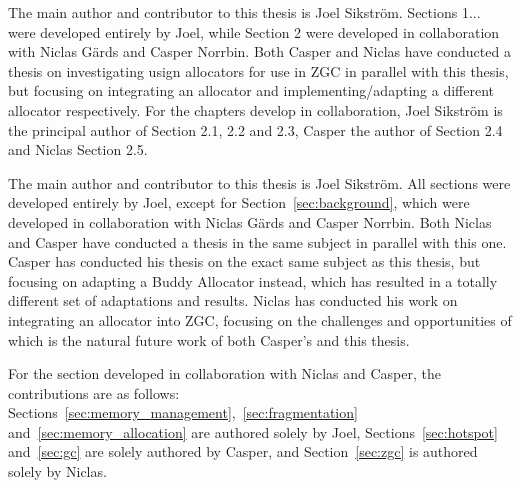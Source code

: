 
The main author and contributor to this thesis is Joel Sikström. Sections 1... were developed entirely by Joel, while Section 2 were developed in collaboration with Niclas Gärds and Casper Norrbin. Both Casper and Niclas have conducted a thesis on investigating usign allocators for use in ZGC in parallel with this thesis, but focusing on integrating an allocator and implementing/adapting a different allocator respectively. For the chapters develop in collaboration, Joel Sikström is the principal author of Section 2.1, 2.2 and 2.3, Casper the author of Section 2.4 and Niclas Section 2.5.

The main author and contributor to this thesis is Joel Sikström. All sections were developed entirely by Joel, except for Section~\ref{sec:background}, which were developed in collaboration with Niclas Gärds and Casper Norrbin. Both Niclas and Casper have conducted a thesis in the same subject in parallel with this one. Casper has conducted his thesis on the exact same subject as this thesis, but focusing on adapting a Buddy Allocator instead, which has resulted in a totally different set of adaptations and results. Niclas has conducted his work on integrating an allocator into ZGC, focusing on the challenges and opportunities of which is the natural future work of both Casper's and this thesis.

For the section developed in collaboration with Niclas and Casper, the contributions are as follows: Sections~\ref{sec:memory_management},~\ref{sec:fragmentation} and~\ref{sec:memory_allocation} are authored solely by Joel, Sections~\ref{sec:hotspot} and~\ref{sec:gc} are solely authored by Casper, and Section~\ref{sec:zgc} is authored solely by Niclas.


